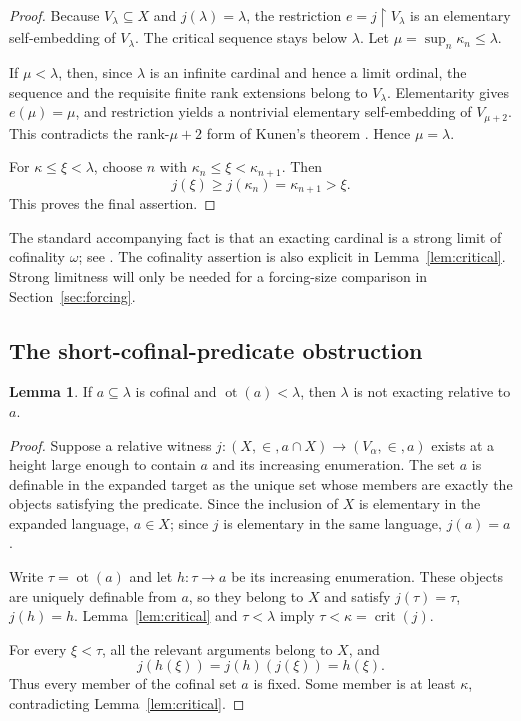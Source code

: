 \documentclass[11pt,letterpaper]{article}
\theoremstyle{definition}
\newtheorem{lemma}[definition]{Lemma}
\newcommand{\crit}{\operatorname{crit}}
\newcommand{\ot}{\operatorname{ot}}
\newcommand{\restr}{\mathbin{\upharpoonright}}
\numberwithin{equation}{section}
\begin{document}
\begin{proof}
Because $V_\lambda\subseteq X$ and $j(\lambda)=\lambda$, the restriction $e=j\restr V_\lambda$ is an elementary self-embedding of $V_\lambda$. The critical sequence stays below $\lambda$. Let $\mu=\sup_n\kappa_n\leq\lambda$.

If $\mu<\lambda$, then, since $\lambda$ is an infinite cardinal and hence a limit ordinal, the sequence and the requisite finite rank extensions belong to $V_\lambda$. Elementarity gives $e(\mu)=\mu$, and restriction yields a nontrivial elementary self-embedding of $V_{\mu+2}$. This contradicts the rank-$\mu+2$ form of Kunen's theorem \cite{kunen}. Hence $\mu=\lambda$.

For $\kappa\leq\xi<\lambda$, choose $n$ with $\kappa_n\leq\xi<\kappa_{n+1}$. Then
\[
 j(\xi)\geq j(\kappa_n)=\kappa_{n+1}>\xi.
\]
This proves the final assertion.
\end{proof}

The standard accompanying fact is that an exacting cardinal is a strong limit of cofinality $\omega$; see \cite[Section~2]{abl}. The cofinality assertion is also explicit in Lemma~\ref{lem:critical}. Strong limitness will only be needed for a forcing-size comparison in Section~\ref{sec:forcing}.

\subsection{The short-cofinal-predicate obstruction}

\begin{lemma}\label{lem:short}
If $a\subseteq\lambda$ is cofinal and $\ot(a)<\lambda$, then $\lambda$ is not exacting relative to $a$.
\end{lemma}

\begin{proof}
Suppose a relative witness $j:(X,\in,a\cap X)\to(V_\alpha,\in,a)$ exists at a height large enough to contain $a$ and its increasing enumeration. The set $a$ is definable in the expanded target as the unique set whose members are exactly the objects satisfying the predicate. Since the inclusion of $X$ is elementary in the expanded language, $a\in X$; since $j$ is elementary in the same language, $j(a)=a$.

Write $\tau=\ot(a)$ and let $h:\tau\to a$ be its increasing enumeration. These objects are uniquely definable from $a$, so they belong to $X$ and satisfy $j(\tau)=\tau$, $j(h)=h$. Lemma~\ref{lem:critical} and $\tau<\lambda$ imply $\tau<\kappa=\crit(j)$.

For every $\xi<\tau$, all the relevant arguments belong to $X$, and
\[
 j(h(\xi))=j(h)(j(\xi))=h(\xi).
\]
Thus every member of the cofinal set $a$ is fixed. Some member is at least $\kappa$, contradicting Lemma~\ref{lem:critical}.
\end{proof}
\end{document}
